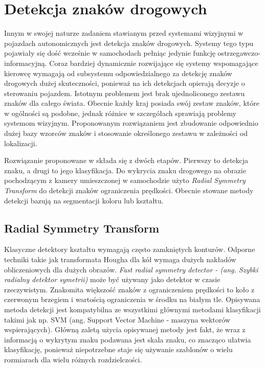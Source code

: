 \section{Detekcja znaków drogowych}

Innym w swojej naturze zadaniem stawianym przed systemami wizyjnymi w pojazdach autonomicznych jest detekcja znaków drogowych. Systemy tego typu pojawiały się dość wcześnie w samochodach pełniąc jedynie funkcję ostrzegawczo-informacyjną. Coraz bardziej dynamicznie rozwijające się systemy wspomagające kierowcę wymagają od subsystemu odpowiedzialnego za detekcję znaków drogowych dużej skuteczności, ponieważ na ich detekcjach opierają decyzje o sterowaniu pojazdem. Istotnym problemem jest brak ujednoliconego zestawu znaków dla całego świata. Obecnie każdy kraj posiada swój zestaw znaków, które w ogólności są podobne, jednak różnice w szczegółach sprawiają problemy systemom wizyjnym. Proponowanym rozwiązaniem jest zbudowanie odpowiednio dużej bazy wzorców znaków i stosowanie określonego zestawu w zależności od lokalizacji. 

Rozwiązanie proponowane w \cite{T2} składa się z dwóch etapów. Pierwszy to detekcja znaku, a drugi to jego klasyfikacja. Do wykrycia znaku drogowego na obrazie pochodzącym z kamery umieszczonej w samochodzie użyto \textit{Radial Symmetry Transform} do detekcji znaków ograniczenia prędkości. Obecnie stowane metody detekcji bazują na segmentacji koloru lub kształtu. 

\subsection{Radial Symmetry Transform}
Klasyczne detektory kształtu wymagają często zamkniętych konturów. Odporne techniki takie jak transformata Hougha dla kół wymaga dużych nakładów obliczeniowych dla dużych obrazów. \textit{Fast radial symmetry detector - (ang. Szybki radialny detektor symetrii)} może być używany jako detektor w czasie rzeczywistym. Znakomita większość znaków z ograniczeniem prędkości to koło z czerwonym brzegiem i wartością ograniczenia w środku na białym tle. Opisywana metoda detekcji jest kompatybilna ze wszystkimi głównymi metodami klasyfikacji takimi jak np. SVM (ang. Support Vector Machine - maszyna wektorów wspierających). Główną zaletą użycia opisywanej metody jest fakt, że wraz z informacją o wykrytym znaku podawana jest skala znaku, co znacząco ułatwia klasyfikację, ponieważ niepotrzebne staje się używanie szablonów o wielu rozmiarach dla wielu różnych rozdzielczości.

